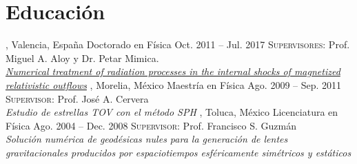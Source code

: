\section{Educación}

%
{\UVval, Valencia, España}%
{Doctorado en Física}%
{Oct. 2011 -- Jul. 2017}%
{}%
{\textsc{Supervisores}: Prof. Miguel A. Aloy y Dr. Petar Mimica.\\%
  \href{http://roderic.uv.es/handle/10550/60003}{\textit{Numerical treatment of radiation processes in the internal shocks of magnetized relativistic outflows}}
}
\cventry{}%
{\IFMes, Morelia, México}%
{Maestría en Física}%
{Ago. 2009 -- Sep. 2011}%
{}%
{\textsc{Supervisor}: Prof. José A. Cervera\\%
  \textit{Estudio de estrellas TOV con el método SPH}
}
\cventry{}%
{\UAEMes, Toluca, México}%
{Licenciatura en Física}%
{Ago. 2004 -- Dec. 2008}
{}%
{\textsc{Supervisor}: Prof. Francisco S. Guzmán\\%
  \textit{Solución numérica de geodésicas nules para la generación de lentes gravitacionales producidos por espaciotiempos esféricamente simétricos y estáticos}
}
